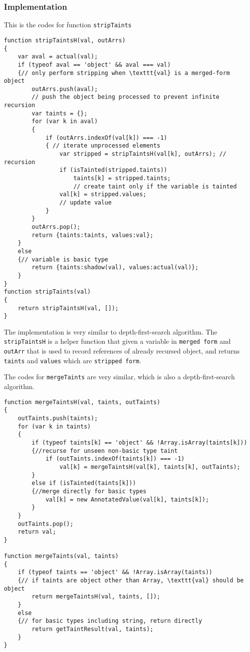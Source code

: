 \subsubsection{Implementation}

This is the codes for function \texttt{stripTaints}

\begin{verbatim}
function stripTaintsH(val, outArrs)
{
    var aval = actual(val);
    if (typeof aval == 'object' && aval === val)
    {// only perform stripping when \texttt{val} is a merged-form object
        outArrs.push(aval);
        // push the object being processed to prevent infinite recursion
        var taints = {};
        for (var k in aval)
        {
            if (outArrs.indexOf(val[k]) === -1)
            { // iterate unprocessed elements
                var stripped = stripTaintsH(val[k], outArrs); // recursion
                if (isTainted(stripped.taints))
                    taints[k] = stripped.taints;
                    // create taint only if the variable is tainted
                val[k] = stripped.values;
                // update value
            }
        }
        outArrs.pop();
        return {taints:taints, values:val};
    }
    else
    {// variable is basic type
        return {taints:shadow(val), values:actual(val)};
    }
}
function stripTaints(val)
{
    return stripTaintsH(val, []);
}
\end{verbatim}

The implementation is very similar to depth-first-search algorithm. The \texttt{stripTaintsH} is a helper function that given a variable in \texttt{merged form} and \texttt{outArr} that is used to record references of already recursed object, and returns \texttt{taints} and \texttt{values} which are \texttt{stripped form}.

The codes for \texttt{mergeTaints} are very similar, which is also a depth-first-search algorithm.

\begin{verbatim}
function mergeTaintsH(val, taints, outTaints)
{
    outTaints.push(taints);
    for (var k in taints)
    {
        if (typeof taints[k] == 'object' && !Array.isArray(taints[k]))
        {//recurse for unseen non-basic type taint
            if (outTaints.indexOf(taints[k]) === -1)
                val[k] = mergeTaintsH(val[k], taints[k], outTaints);
        }
        else if (isTainted(taints[k]))
        {//merge directly for basic types
            val[k] = new AnnotatedValue(val[k], taints[k]);
        }
    }
    outTaints.pop();
    return val;
}

function mergeTaints(val, taints)
{
    if (typeof taints == 'object' && !Array.isArray(taints))
    {// if taints are object other than Array, \texttt{val} should be object
        return mergeTaintsH(val, taints, []);
    }
    else
    {// for basic types including string, return directly
        return getTaintResult(val, taints);
    }
}
\end{verbatim}

